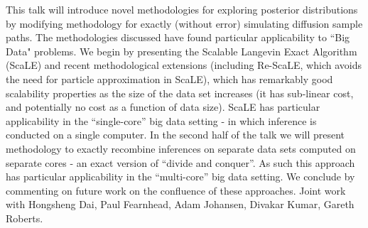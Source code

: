 This talk will introduce novel methodologies for exploring posterior distributions by modifying methodology for exactly (without error) simulating diffusion sample paths. The methodologies discussed have found particular applicability to ``Big Data" problems. We begin by presenting the Scalable Langevin Exact Algorithm (ScaLE) and recent methodological extensions (including Re-ScaLE, which avoids the need for particle approximation in ScaLE), which has remarkably good scalability properties as the size of the data set increases (it has sub-linear cost, and potentially no cost as a function of data size). ScaLE has particular applicability in the “single-core” big data setting - in which inference is conducted on a single computer. In the second half of the talk we will present methodology to exactly recombine inferences on separate data sets computed on separate cores - an exact version of ``divide and conquer''. As such this approach has particular applicability in the ``multi-core'' big data setting. We conclude by commenting on future work on the confluence of these approaches. Joint work with Hongsheng Dai, Paul Fearnhead, Adam Johansen, Divakar Kumar, Gareth Roberts.